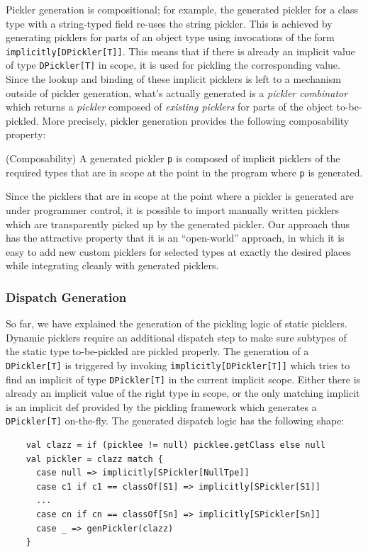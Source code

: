 \documentclass[preprint,10pt]{sigplanconf}
\theoremstyle{definition}
\theoremstyle{definition}
\newcommand{\term}[1]{\mbox{\texttt{#1}}}
\begin{document}
Pickler generation is compositional; for example, the generated pickler for a
class type with a string-typed field re-uses the string pickler. This is
achieved by generating picklers for parts of an object type using invocations
of the form \verb|implicitly[DPickler[T]]|. This means that if there is
already an implicit value of type \term{DPickler[T]} in scope, it is used for
pickling the corresponding value. Since the lookup and binding of these
implicit picklers is left to a mechanism outside of pickler generation, what's
actually generated is a {\em pickler combinator} which returns a {\em pickler}
composed of {\em existing picklers} for parts of the object to-be-pickled.
More precisely, pickler generation provides the following composability
property:

\begin{prop}{(Composability)}
A generated pickler \term{p} is composed of implicit picklers of the required
types that are in scope at the point in the program where \term{p} is
generated.
\end{prop}

Since the picklers that are in scope at the point where a pickler is generated
are under programmer control, it is possible to import manually written
picklers which are transparently picked up by the generated pickler. Our
approach thus has the attractive property that it is an ``open-world''
approach, in which it is easy to add new custom picklers for selected types at
exactly the desired places while integrating cleanly with generated picklers.

\subsubsection{Dispatch Generation}

So far, we have explained the generation of the pickling logic of static
picklers. Dynamic picklers require an additional dispatch step to make sure
subtypes of the static type to-be-pickled are pickled properly. The generation
of a \term{DPickler[T]} is triggered by invoking
\verb|implicitly[DPickler[T]]| which tries to find an implicit of type
\term{DPickler[T]} in the current implicit scope. Either there is already an
implicit value of the right type in scope, or the only matching implicit is an
implicit def provided by the pickling framework which generates a
\term{DPickler[T]} on-the-fly. The generated dispatch logic has the following
shape:

\begin{lstlisting}
    val clazz = if (picklee != null) picklee.getClass else null
    val pickler = clazz match {
      case null => implicitly[SPickler[NullTpe]]
      case c1 if c1 == classOf[S1] => implicitly[SPickler[S1]]
      ...
      case cn if cn == classOf[Sn] => implicitly[SPickler[Sn]]
      case _ => genPickler(clazz)
    }
\end{lstlisting}
\end{document}
